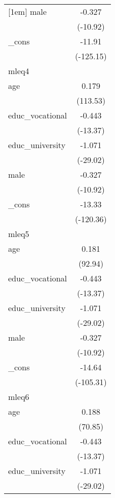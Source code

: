 {\begin{tabular}{l*{1}{c}}
[1em]
male        &      -0.327\sym{***}\\
            &    (-10.92)         \\
[1em]
\_cons      &      -11.91\sym{***}\\
            &   (-125.15)         \\
\hline
mleq4       &                     \\
age         &       0.179\sym{***}\\
            &    (113.53)         \\
[1em]
educ\_vocational&      -0.443\sym{***}\\
            &    (-13.37)         \\
[1em]
educ\_university&      -1.071\sym{***}\\
            &    (-29.02)         \\
[1em]
male        &      -0.327\sym{***}\\
            &    (-10.92)         \\
[1em]
\_cons      &      -13.33\sym{***}\\
            &   (-120.36)         \\
\hline
mleq5       &                     \\
age         &       0.181\sym{***}\\
            &     (92.94)         \\
[1em]
educ\_vocational&      -0.443\sym{***}\\
            &    (-13.37)         \\
[1em]
educ\_university&      -1.071\sym{***}\\
            &    (-29.02)         \\
[1em]
male        &      -0.327\sym{***}\\
            &    (-10.92)         \\
[1em]
\_cons      &      -14.64\sym{***}\\
            &   (-105.31)         \\
\hline
mleq6       &                     \\
age         &       0.188\sym{***}\\
            &     (70.85)         \\
[1em]
educ\_vocational&      -0.443\sym{***}\\
            &    (-13.37)         \\
[1em]
educ\_university&      -1.071\sym{***}\\
            &    (-29.02)         \\

\end{tabular}}
